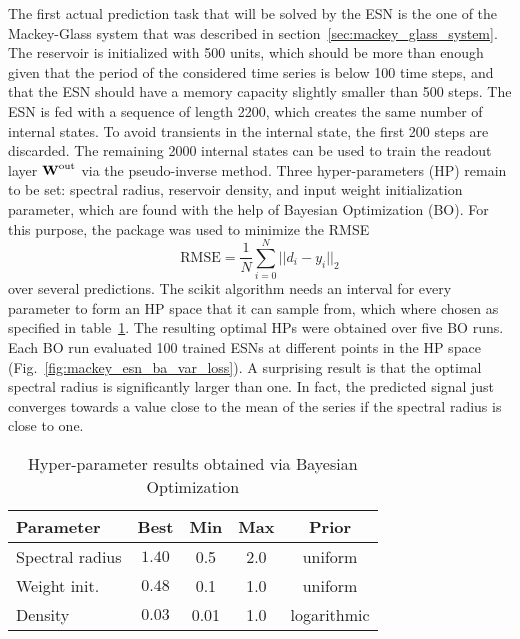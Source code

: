 The first actual prediction task that will be solved by the ESN is the one of
the Mackey-Glass system that was described in
section~\ref{sec:mackey_glass_system}.  The reservoir is initialized with 500
units, which should be more than enough given that the period of the
considered time series is below 100 time steps, and that the ESN should have a
memory capacity slightly smaller than 500 steps.  The ESN is fed with a
sequence of length 2200, which creates the same number of internal states. To
avoid transients in the internal state, the first 200 steps are discarded. The
remaining 2000 internal states can be used to train the readout layer
$\boldsymbol{\textbf{W}}^{\text{out}}$ via the pseudo-inverse method. Three hyper-parameters (HP) remain
to be set: spectral radius, reservoir density, and input weight initialization
parameter, which are found with the help of Bayesian Optimization (BO).  For
this purpose, the package  was used to minimize the
RMSE
\begin{equation}
  \text{RMSE} = \frac{1}{N} \sum_{i=0}^N || d_i - y_i ||_2
\end{equation}
over several predictions.  The scikit algorithm needs an interval for every
parameter to form an HP space that it can sample from, which where chosen as
specified in table~\ref{tab:mackey_bo}. The resulting optimal HPs were obtained
over five BO runs.  Each BO run evaluated 100 trained ESNs at different points
in the HP space (Fig.~\ref{fig:mackey_esn_ba_var_loss}).  A surprising result
is that the optimal spectral radius is significantly larger than one.
In fact, the predicted signal just converges towards a value close to the mean
of the series if the spectral radius is close to one.
\begin{table}[h]
  \centering
  \begin{tabular}{|l c c c c|}
    \hline \rowcolor{gray!50}
    Parameter        & Best              & Min  & Max & Prior \\ \hline
    Spectral radius  & $1.40$   & 0.5  & 2.0 & uniform \\
    Weight init.     & $0.48$   & 0.1  & 1.0 & uniform \\
    Density          & $0.03$   & 0.01 & 1.0 & logarithmic \\
    \hline
  \end{tabular}
  \caption{Hyper-parameter results obtained via Bayesian Optimization}
  \label{tab:mackey_bo}
\end{table}

